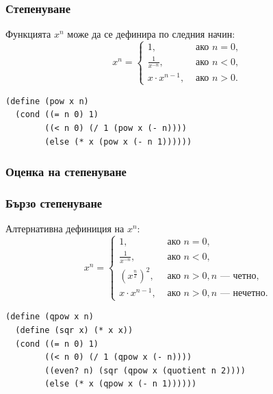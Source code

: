 \documentclass[alsotrans]{beamerswitch}
\begin{document}
\begin{frame}[fragile]
  \frametitle{Степенуване}

  Функцията $x^n$ може да се дефинира по следния начин:
  \begin{equation*}
    x^n = \begin{cases}
      1,&\text{ ако }n = 0,\\
      \frac 1 {x^{-n}},&\text{ ако }n < 0,\\
      x\cdot x^{n-1},&\text{ ако }n > 0.
    \end{cases}
  \end{equation*}
  \pause
\begin{lstlisting}
(define (pow x n)
  (cond ((= n 0) 1)
        ((< n 0) (/ 1 (pow x (- n))))
        (else (* x (pow x (- n 1))))))
\end{lstlisting}
\end{frame}

\begin{frame}
  \frametitle{Оценка на степенуване}

  \begin{center}
    \tiny
  \end{center}
  \vspace{-4ex}
\end{frame}

\begin{frame}[fragile]
  \frametitle{Бързо степенуване}

  Алтернативна дефиниция на $x^n$:
  \begin{equation*}
    x^n = \begin{cases}
      1,&\text{ ако }n = 0,\\
      \frac 1 {x^{-n}},&\text{ ако }n < 0,\\
      (x^{\frac n2})^2,&\text{ ако }n > 0, n\text{ --- четно},\\
      x\cdot x^{n-1},&\text{ ако }n > 0, n\text{ --- нечетно}.
    \end{cases}
  \end{equation*}
  \pause
\begin{lstlisting}
(define (qpow x n)
  (define (sqr x) (* x x))
  (cond ((= n 0) 1)
        ((< n 0) (/ 1 (qpow x (- n))))
        ((even? n) (sqr (qpow x (quotient n 2))))
        (else (* x (qpow x (- n 1))))))
\end{lstlisting}
\end{frame}
\end{document}
